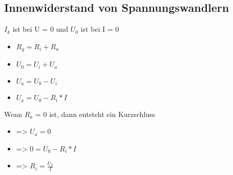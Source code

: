 \documentclass[../../main.tex]{subfiles}
\begin{document}
\subsection{Innenwiderstand von Spannungswandlern}
$I_k$ ist bei U = 0 und $U_0$ ist bei I = 0
\begin{itemize}
    \item $R_g = R_i + R_a$
    \item $U_0 = U_i + U_a$
    \item $U_a = U_0 - U_i$
    \item $U_a = U_0 - R_i * I$
\end{itemize}
Wenn $R_a$ = 0 ist, dann entsteht ein Kurzschluss 
\begin{itemize}
    \item => $U_a = 0$
    \item => $0 = U_0 - R_i * I$
    \item => $R_i = \frac{U_0}{I}$
\end{itemize}
\end{document}
